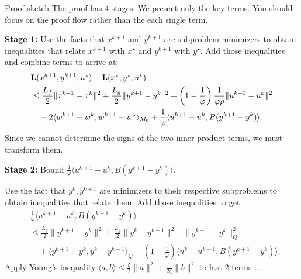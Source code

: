 \documentclass[10pt,mathserif]{beamer}
\begin{document}
\begin{frame}{Proof sketch}
The proof has 4 stages. We present only the key terms. You should focus on the proof flow rather than the each single term. %
\bigskip

\textbf{Stage 1:} Use the facts that $x^{k+1}$ and $y^{k+1}$ are subproblem minimizers to obtain inequalities that relate $x^{k+1}$ with $x^\star$ and $y^{k+1}$ with $y^\star$. Add those inequalities and combine terms to arrive at:
\begin{align}
&\mathbf{L}(x^{k+1},y^{k+1},u^\star)-\mathbf{L}(x^\star,y^\star,u^\star)   \label{eq:extended-admm-step1}
\\
&\le
\frac{L_f}{2}\|x^{k+1}-x^k\|^2+\frac{L_g}{2}\|y^{k+1}-y^k\|^2
+\left(1-\frac{1}{\varphi}\right)\frac{1}{\varphi\rho}\|u^{k+1}-u^k\|^2 \nonumber\\
&
 \quad-2\langle
w^{k+1}-w^{k},w^{k+1}-w^\star
\rangle_{M_0}
+\frac{1}{\varphi}\langle u^{k+1}-u^k,B(y^{k+1}-y^k)\rangle. \nonumber
\end{align} 
Since we cannot determine the signs of the two inner-product terms, we must transform them.
\end{frame}

\begin{frame}

\textbf{Stage 2:} Bound $\frac{1}{\varphi}\langle u^{k+1}-u^k,B(y^{k+1}-y^k)\rangle$. 
\medskip

Use the fact that $y^{k},y^{k+1}$ are minimizers to their respective subproblems to obtain inequalities that relate them. Add those inequalities to get
\begin{align*}
  & \frac{1}{\varphi}\langle u^{k+1}-u^k,B (y^{k+1}-y^k) \rangle  \\
  & \le \frac{L_g}{2} \|y^{k+1}-y^k\|^2 + \frac{L_g}{2}\|y^k-y^{k-1}\|^2
      - \|y^{k+1}-y^k\|_Q^2\\
      &\quad
      + \langle y^{k+1}-y^k, y^k-y^{k-1} \rangle_Q - \left(1-\frac{1}{\varphi}\right)\langle u^k-u^{k-1},B (y^{k+1}-y^k) \rangle.
\end{align*}
Apply Young's inequality $
  \langle  a, b\rangle \le \frac{\zeta}{2}\|a\|^2 + \frac{1}{2\zeta}\|b\|^2$ to last 2 terms ...
\end{frame}
\end{document}
